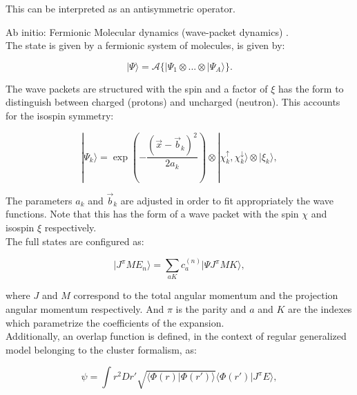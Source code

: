 \documentclass[openany]{book}
\begin{document}
This can be interpreted as an antisymmetric operator. 

Ab initio: Fermionic Molecular dynamics (wave-packet dynamics) \cite{neff_feldmeier_langanke_2011}. \\

The state is given by a fermionic system of molecules, is given by: 

\begin{equation}\label{eq:micro_FMD_state}
	| \Psi \rangle = \mathcal{A} \{ |\Psi_1 \otimes ... \otimes |\Psi_A \rangle \}.
\end{equation}

The wave packets are structured with the spin and a factor of $\xi$ has the form to distinguish between charged (protons) and uncharged (neutron). This accounts for the isospin symmetry:

\begin{equation} \label{eq:micro_FMD_wavePacket}
	|\Psi_k \rangle = \exp {\left ( - \frac{(\vec x - \vec b_k)^2}{2a_k} \right)} \otimes |\chi^{\uparrow}_k,  \chi^{\downarrow}_k \rangle \otimes |\xi_k \rangle, 
\end{equation}

The parameters $a_k$ and $\vec b_k$ are adjusted in order to fit appropriately the wave functions. Note that this has the form of a wave packet with the spin  $\chi$ and isospin  $\xi$ respectively. \\


The full states are configured as: 

\begin{equation} \label{eq:micro_FMD_generalState}
	| J^{\pi} M E_n \rangle = \sum_{aK}{c^{(n)}_a | \Psi J^\pi MK \rangle} , 
\end{equation}

where $J$ and $M$ correspond to the total angular momentum and the projection angular momentum respectively. And $\pi$ is the parity and $a$ and $K$ are the indexes which parametrize the coefficients of the expansion.  \\

Additionally, an overlap function is defined, in the context of regular generalized model belonging to the cluster formalism,  as: 


\begin{equation} \label{eq:micro_FMD_overlap}
	\psi = \int r^2 Dr' \sqrt{\langle \Phi(r) | \Phi(r') \rangle } \langle \Phi(r') | J^{\pi} E \rangle,
\end{equation}
\end{document}
